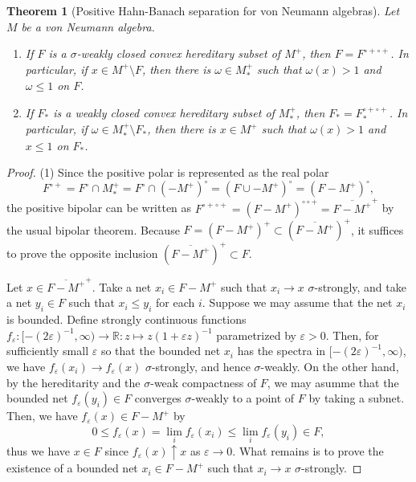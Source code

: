 \documentclass[a4paper]{amsart}
\newcommand{\e}{\varepsilon}
\theoremstyle{plain}
\newtheorem{thm}{Theorem}[section]
\theoremstyle{definition}
\begin{document}
\begin{thm}[Positive Hahn-Banach separation for von Neumann algebras]
Let $M$ be a von Neumann algebra.
\begin{enumerate}
\item If $F$ is a $\sigma$-weakly closed convex hereditary subset of $M^+$, then $F=F^{\circ+\circ+}$. In particular, if $x\in M^+\setminus F$, then there is $\omega\in M_*^+$ such that $\omega(x)>1$ and $\omega\le1$ on $F$.
\item If $F_*$ is a weakly closed convex hereditary subset of $M_*^+$, then $F_*=F_*^{\circ+\circ+}$. In particular, if $\omega\in M_*^+\setminus F_*$, then there is $x\in M^+$ such that $\omega(x)>1$ and $x\le1$ on $F_*$.
\end{enumerate}
\end{thm}
\begin{proof}
(1)
Since the positive polar is represented as the real polar
\[F^{\circ+}=F^\circ\cap M_*^+=F^\circ\cap(-M^+)^\circ=(F\cup-M^+)^\circ=(F-M^+)^\circ,\]
the positive bipolar can be written as $F^{\circ+\circ+}=(F-M^+)^{\circ\circ+}=\overline{F-M^+}^+$ by the usual bipolar theorem.
Because $F=(F-M^+)^+\subset(\overline{F-M^+})^+$, it suffices to prove the opposite inclusion $(\overline{F-M^+})^+\subset F$.

Let $x\in\overline{F-M^+}^+$.
Take a net $x_i\in F-M^+$ such that $x_i\to x$ $\sigma$-strongly, and take a net $y_i\in F$ such that $x_i\le y_i$ for each $i$.
Suppose we may assume that the net $x_i$ is bounded.
Define strongly continuous functions $f_\e:[-(2\e)^{-1},\infty)\to\mathbb{R}:z\mapsto z(1+\e z)^{-1}$ parametrized by $\e>0$.
Then, for sufficiently small $\e$ so that the bounded net $x_i$ has the spectra in $[-(2\e)^{-1},\infty)$, we have $f_\e(x_i)\to f_\e(x)$ $\sigma$-strongly, and hence $\sigma$-weakly.
On the other hand, by the hereditarity and the $\sigma$-weak compactness of $F$, we may asumme that the bounded net $f_\e(y_i)\in F$ converges $\sigma$-weakly to a point of $F$ by taking a subnet.
Then, we have $f_\e(x)\in F-M^+$ by
\[0\le f_\e(x)=\lim_if_\e(x_i)\le\lim_if_\e(y_i)\in F,\]
thus we have $x\in F$ since $f_\e(x)\uparrow x$ as $\e\to0$.
What remains is to prove the existence of a bounded net $x_i\in F-M^+$ such that $x_i\to x$ $\sigma$-strongly.


\end{proof}
\end{document}
